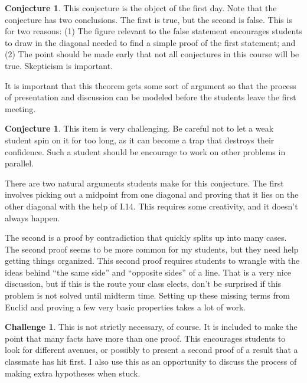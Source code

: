 \documentclass{tufte-handout}
\theoremstyle{definition}
\newtheorem{conjecture}[problem]{Conjecture}
\newtheorem{challenge}[problem]{Challenge}
\begin{document}
\begin{conjecture}
This conjecture is the object of the first day.
Note that the conjecture has two conclusions.
The first is true, but the second is false.
This is for two reasons:
(1) The figure relevant to the false statement encourages students to draw in the diagonal needed to find a simple proof of the first statement; and
(2) The point should be made early that not all conjectures in this course will be true.
Skepticism is important.

It is important that this theorem gets some sort of argument so that the process of presentation and discussion can be modeled before the students leave the first meeting.\\
\end{conjecture}

\begin{conjecture}
This item is very challenging.
Be careful not to let a weak student spin on it for too long, as it can become a trap that destroys their confidence.
Such a student should be encourage to work on other problems in parallel.

There are two natural arguments students make for this conjecture.
The first involves picking out a midpoint from one diagonal and proving that it lies on the other diagonal with the help of I.14.
This requires some creativity, and it doesn't always happen.

The second is a proof by contradiction that quickly splits up into many cases.
The second proof seems to be more common for my students, but they need help getting things organized.
This second proof requires students to wrangle with the ideas behind ``the same side'' and ``opposite sides'' of a line.
That is a very nice discussion, but if this is the route your class elects, don't be surprised if this problem is not solved until midterm time.
Setting up these missing terms from Euclid and proving a few very basic properties takes a lot of work.
\end{conjecture}

\begin{challenge}
This is not strictly necessary, of course.
It is included to make the point that many facts have more than one proof.
This encourages students to look for different avenues, or possibly to present a second proof of a result that a classmate has hit first.
I also use this as an opportunity to discuss the process of making extra hypotheses when stuck.
\end{challenge}
\end{document}
